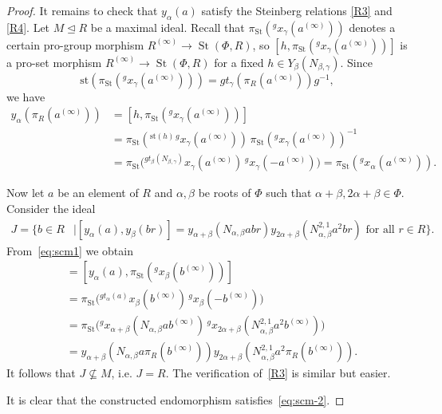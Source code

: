 \documentclass[oneside, 11pt]{amsart}
\numberwithin{equation}{section}
\theoremstyle{definition}
\theoremstyle{remark}
\DeclareMathOperator\St{St}
\newcommand{\up}[2]{{^{#1}\!{#2}}}
\begin{document}
\begin{proof}
 It remains to check that \(y_\alpha(a)\) satisfy the Steinberg relations \eqref{R3} and \eqref{R4}.
 Let \(M \trianglelefteq R\) be a maximal ideal. Recall that \(\pi_{\St}(\up g{x_\gamma(a^{(\infty)})})\) denotes a certain pro-group morphism \(R^{(\infty)} \to \St(\Phi, R)\), so \([h, \pi_{\St}(\up g{x_\gamma(a^{(\infty)})})]\) is a pro-set morphism \(R^{(\infty)} \to \St(\Phi, R)\) for a fixed \(h \in Y_\beta(N_{\beta, \gamma})\). Since
 \[\mathrm{st}(\pi_{\St}(\up g{x_\gamma(a^{(\infty)})})) = g t_\gamma(\pi_R(a^{(\infty)})) g^{-1},\]
 we have
 \begin{align} 
  y_\alpha(\pi_R(a^{(\infty)})) &= [h, \pi_{\St}(\up g{x_\gamma(a^{(\infty)})})] \nonumber \\
  &= \pi_{\St}(\up{\mathrm{st}(h)\, g}{x_\gamma(a^{(\infty)})})\, \pi_{\St}(\up g{x_\gamma(a^{(\infty)})})^{-1} \label{eq:scm1} \\
  &= \pi_{\St}\bigl(\up{g t_\beta(N_{\beta, \gamma})}{x_\gamma(a^{(\infty)})}\, \up g{x_\gamma(-a^{(\infty)})}\bigr) = \pi_{\St}(\up g{x_\alpha(a^{(\infty)})}).\nonumber
 \end{align}
 
 Now let $a$ be an element of $R$ and \(\alpha, \beta\) be roots of $\Phi$ such that \(\alpha + \beta, 2\alpha + \beta \in \Phi\). 
 Consider the ideal
 \begin{align*}
 J = \{b \in R &\mid [y_\alpha(a), y_\beta(br)] = y_{\alpha + \beta}(N_{\alpha, \beta} abr)
 y_{2\alpha + \beta}(N_{\alpha, \beta}^{2,1} a^2 br) \text{ for all } r \in R\}.
 \end{align*}
 From~\eqref{eq:scm1} we obtain 
 \begin{align*}
 [y_\alpha(a), y_\beta(\pi_R(b^{(\infty)}))] &= [y_\alpha(a), \pi_{\St}(\up g{x_\beta(b^{(\infty)})})]\\ 
 &= \pi_{\St}\bigl(\up{g t_\alpha(a)}{x_\beta(b^{(\infty)})}\, \up g{x_\beta(-b^{(\infty)})}\bigr)\\
 &= \pi_{\St}\bigl(\up g{x_{\alpha + \beta}(N_{\alpha, \beta} a b^{(\infty)})}\, \up g{x_{2\alpha + \beta}(N_{\alpha, \beta}^{2,1} a^2 b^{(\infty)})}\bigr)\\
 &= y_{\alpha + \beta}(N_{\alpha, \beta} a \pi_R(b^{(\infty)})) y_{2\alpha + \beta}(N_{\alpha, \beta}^{2,1} a^2 \pi_R(b^{(\infty)})).
 \end{align*}
 It follows that \(J \not \subseteq M\), i.e. \(J = R\). The verification of~\eqref{R3} is similar but easier.   
 
 It is clear that the constructed endomorphism satisfies~\eqref{eq:scm-2}. \end{proof}
 
\end{document}
